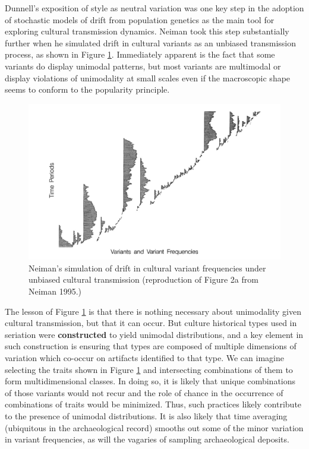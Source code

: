Dunnell's \citeyearpar{Dunnell1978} exposition of style as neutral
variation was one key step in the adoption of stochastic models of drift
from population genetics as the main tool for exploring cultural
transmission dynamics. Neiman \citeyearpar{Neiman1995} took this step
substantially further when he simulated drift in cultural variants as an
unbiased transmission process, as shown in Figure \ref{img:neiman-fig2}.
Immediately apparent is the fact that some variants do display unimodal
patterns, but most variants are multimodal or display violations of
unimodality at small scales even if the macroscopic shape seems to
conform to the popularity principle.

\begin{figure}[ht]
\centering
\includegraphics[scale=0.6]{graphics/multipleseriation/neiman-1995-figure2a.pdf}
\caption{Neiman's simulation of drift in cultural variant frequencies under unbiased cultural transmission (reproduction of Figure 2a from Neiman 1995.)}
\label{img:neiman-fig2}
\end{figure}

The lesson of Figure \ref{img:neiman-fig2} is that there is nothing
necessary about unimodality given cultural transmission, but that it can
occur. But culture historical types used in seriation were
\textbf{constructed} to yield unimodal distributions, and a key element
in such construction is ensuring that types are composed of multiple
dimensions of variation which co-occur on artifacts identified to that
type. We can imagine selecting the traits shown in Figure
\ref{img:neiman-fig2} and intersecting combinations of them to form
multidimensional classes. In doing so, it is likely that unique
combinations of those variants would not recur and the role of chance in
the occurrence of combinations of traits would be minimized. Thus, such
practices likely contribute to the presence of unimodal distributions.
It is also likely that time averaging (ubiquitous in the archaeological
record) smooths out some of the minor variation in variant frequencies,
as will the vagaries of sampling archaeological deposits.

